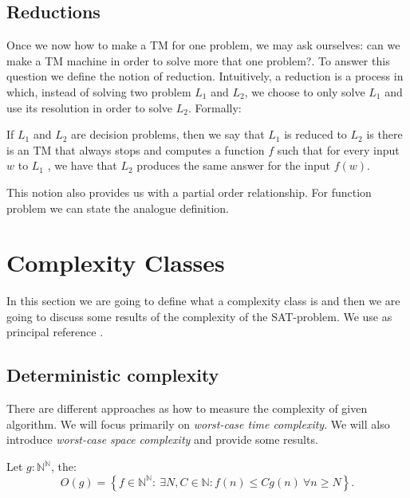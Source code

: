   
\subsection{Reductions}

Once we now how to make a TM for one problem, we may ask ourselves: can we make a TM machine in order to solve more that one problem?. To answer this question we define the notion of reduction. Intuitively, a reduction is a process in which, instead of solving two problem $L_1$ and $L_2$, we choose to only solve $L_1$ and use its resolution in order to solve $L_2$. Formally:

\begin{definition}
If $L_1$ and $L_2$ are decision problems, then we say that $L_1$ is reduced to $L_2$ is there is an TM that always stops and computes a function $f$ such that for every input $w$ to $L_1$ , we have that $L_2$ produces the same answer for the input $f (w )$.  
\end{definition}


This notion also provides us with a partial order relationship. For function problem we can state the analogue definition. 


\section{Complexity Classes}
\label{sec:complexity}

In this section we are going to define what a complexity class is and then we are going to discuss some results of the complexity of the SAT-problem. We use as principal reference \cite{arora2009computational}.

\subsection{Deterministic complexity}
\label{sub:detcomp}
There are different approaches as how to measure the complexity of given algorithm. We will focus primarily on \emph{worst-case time complexity}. We will also introduce \emph{worst-case space complexity} and provide some results.

\begin{definition}
  Let $g:\mathbb{N}^\mathbb{N}$, the:
  $$O(g) = \left\{ f\in \mathbb{N}^\mathbb{N} :\ \exists N,C \in \mathbb{N} : f(n) \le Cg(n) \ \forall  n \ge N\right\}.$$
\end{definition}

